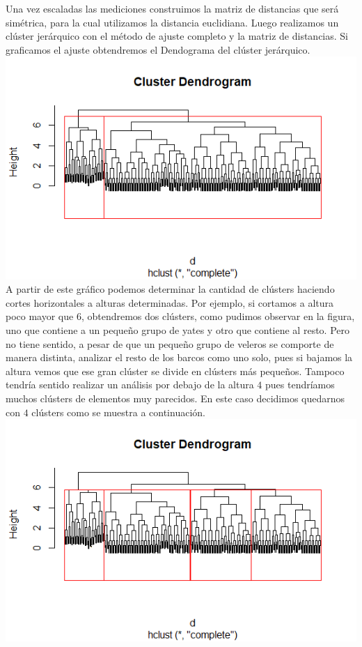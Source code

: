 \documentclass[twoside]{article}
\begin{document}
\begin{multicols}{2}
Una vez escaladas las mediciones construimos la matriz de distancias que ser\'a sim\'etrica, para la cual utilizamos la distancia euclidiana. Luego realizamos un cl\'uster jer\'arquico con el m\'etodo de ajuste completo y la matriz de distancias. Si graficamos el ajuste obtendremos el Dendograma del cl\'uster jer\'arquico.\\

\includegraphics[scale = 0.5]{images/pic_29.png} \\

A partir de este gr\'afico podemos determinar la cantidad de cl\'usters haciendo cortes horizontales a alturas determinadas. Por ejemplo, si cortamos a altura poco mayor que $6$, obtendremos dos cl\'usters, como pudimos observar en la figura, uno que contiene a un peque\~no grupo de yates y otro que contiene al resto. Pero no tiene sentido, a pesar de que un peque\~no grupo de veleros se comporte de manera distinta, analizar el resto de los barcos como uno solo, pues si bajamos la altura vemos que ese gran cl\'uster se divide en cl\'usters m\'as peque\~nos. Tampoco tendr\'ia sentido realizar un an\'alisis por debajo de la altura $4$ pues tendr\'iamos muchos cl\'usters de elementos muy parecidos. En este caso decidimos quedarnos con $4$ cl\'usters como se muestra a continuaci\'on.\\

\includegraphics[scale = 0.5]{images/pic_30.png} \\


\end{multicols}
\end{document}
